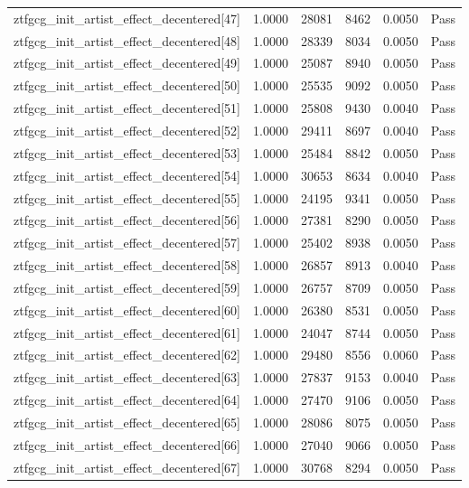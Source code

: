 \begin{table}[htbp]
\begin{tabular}{llrrll}
ztfgcg\_init\_artist\_effect\_decentered[47] & 1.0000 & 28081 & 8462 & 0.0050 & Pass \\
ztfgcg\_init\_artist\_effect\_decentered[48] & 1.0000 & 28339 & 8034 & 0.0050 & Pass \\
ztfgcg\_init\_artist\_effect\_decentered[49] & 1.0000 & 25087 & 8940 & 0.0050 & Pass \\
ztfgcg\_init\_artist\_effect\_decentered[50] & 1.0000 & 25535 & 9092 & 0.0050 & Pass \\
ztfgcg\_init\_artist\_effect\_decentered[51] & 1.0000 & 25808 & 9430 & 0.0040 & Pass \\
ztfgcg\_init\_artist\_effect\_decentered[52] & 1.0000 & 29411 & 8697 & 0.0040 & Pass \\
ztfgcg\_init\_artist\_effect\_decentered[53] & 1.0000 & 25484 & 8842 & 0.0050 & Pass \\
ztfgcg\_init\_artist\_effect\_decentered[54] & 1.0000 & 30653 & 8634 & 0.0040 & Pass \\
ztfgcg\_init\_artist\_effect\_decentered[55] & 1.0000 & 24195 & 9341 & 0.0050 & Pass \\
ztfgcg\_init\_artist\_effect\_decentered[56] & 1.0000 & 27381 & 8290 & 0.0050 & Pass \\
ztfgcg\_init\_artist\_effect\_decentered[57] & 1.0000 & 25402 & 8938 & 0.0050 & Pass \\
ztfgcg\_init\_artist\_effect\_decentered[58] & 1.0000 & 26857 & 8913 & 0.0040 & Pass \\
ztfgcg\_init\_artist\_effect\_decentered[59] & 1.0000 & 26757 & 8709 & 0.0050 & Pass \\
ztfgcg\_init\_artist\_effect\_decentered[60] & 1.0000 & 26380 & 8531 & 0.0050 & Pass \\
ztfgcg\_init\_artist\_effect\_decentered[61] & 1.0000 & 24047 & 8744 & 0.0050 & Pass \\
ztfgcg\_init\_artist\_effect\_decentered[62] & 1.0000 & 29480 & 8556 & 0.0060 & Pass \\
ztfgcg\_init\_artist\_effect\_decentered[63] & 1.0000 & 27837 & 9153 & 0.0040 & Pass \\
ztfgcg\_init\_artist\_effect\_decentered[64] & 1.0000 & 27470 & 9106 & 0.0050 & Pass \\
ztfgcg\_init\_artist\_effect\_decentered[65] & 1.0000 & 28086 & 8075 & 0.0050 & Pass \\
ztfgcg\_init\_artist\_effect\_decentered[66] & 1.0000 & 27040 & 9066 & 0.0050 & Pass \\
ztfgcg\_init\_artist\_effect\_decentered[67] & 1.0000 & 30768 & 8294 & 0.0050 & Pass \\

\end{tabular}
\end{table}
